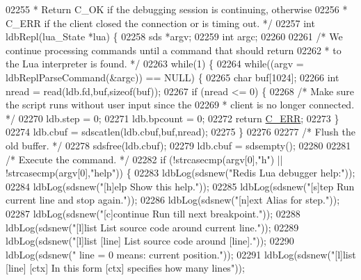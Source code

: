 \begin{DoxyCode}
{{{{{{{{{{{{{{{{{{{{{{{{02255 \textcolor{comment}{ * Return C\_OK if the debugging session is continuing, otherwise}
02256 \textcolor{comment}{ * C\_ERR if the client closed the connection or is timing out. */}
02257 \textcolor{keywordtype}{int} ldbRepl(lua\_State *lua) \{
02258     sds *argv;
02259     \textcolor{keywordtype}{int} argc;
02260 
02261     \textcolor{comment}{/* We continue processing commands until a command that should return}
02262 \textcolor{comment}{     * to the Lua interpreter is found. */}
02263     \textcolor{keywordflow}{while}(1) \{
02264         \textcolor{keywordflow}{while}((argv = ldbReplParseCommand(&argc)) == NULL) \{
02265             \textcolor{keywordtype}{char} buf[1024];
02266             \textcolor{keywordtype}{int} nread = read(ldb.fd,buf,\textcolor{keyword}{sizeof}(buf));
02267             \textcolor{keywordflow}{if} (nread <= 0) \{
02268                 \textcolor{comment}{/* Make sure the script runs without user input since the}
02269 \textcolor{comment}{                 * client is no longer connected. */}
02270                 ldb.step = 0;
02271                 ldb.bpcount = 0;
02272                 \textcolor{keywordflow}{return} \hyperlink{server_8h_af98ac28d5f4d23d7ed5985188e6fb7d1}{C\_ERR};
02273             \}
02274             ldb.cbuf = sdscatlen(ldb.cbuf,buf,nread);
02275         \}
02276 
02277         \textcolor{comment}{/* Flush the old buffer. */}
02278         sdsfree(ldb.cbuf);
02279         ldb.cbuf = sdsempty();
02280 
02281         \textcolor{comment}{/* Execute the command. */}
02282         \textcolor{keywordflow}{if} (!strcasecmp(argv[0],\textcolor{stringliteral}{"h"}) || !strcasecmp(argv[0],\textcolor{stringliteral}{"help"})) \{
02283 ldbLog(sdsnew(\textcolor{stringliteral}{"Redis Lua debugger help:"}));
02284 ldbLog(sdsnew(\textcolor{stringliteral}{"[h]elp               Show this help."}));
02285 ldbLog(sdsnew(\textcolor{stringliteral}{"[s]tep               Run current line and stop again."}));
02286 ldbLog(sdsnew(\textcolor{stringliteral}{"[n]ext               Alias for step."}));
02287 ldbLog(sdsnew(\textcolor{stringliteral}{"[c]continue          Run till next breakpoint."}));
02288 ldbLog(sdsnew(\textcolor{stringliteral}{"[l]list              List source code around current line."}));
02289 ldbLog(sdsnew(\textcolor{stringliteral}{"[l]list [line]       List source code around [line]."}));
02290 ldbLog(sdsnew(\textcolor{stringliteral}{"                     line = 0 means: current position."}));
02291 ldbLog(sdsnew(\textcolor{stringliteral}{"[l]list [line] [ctx] In this form [ctx] specifies how many lines"}));
}}}}}}}}}}}}}}}}}}}}}}}}
\end{DoxyCode}
